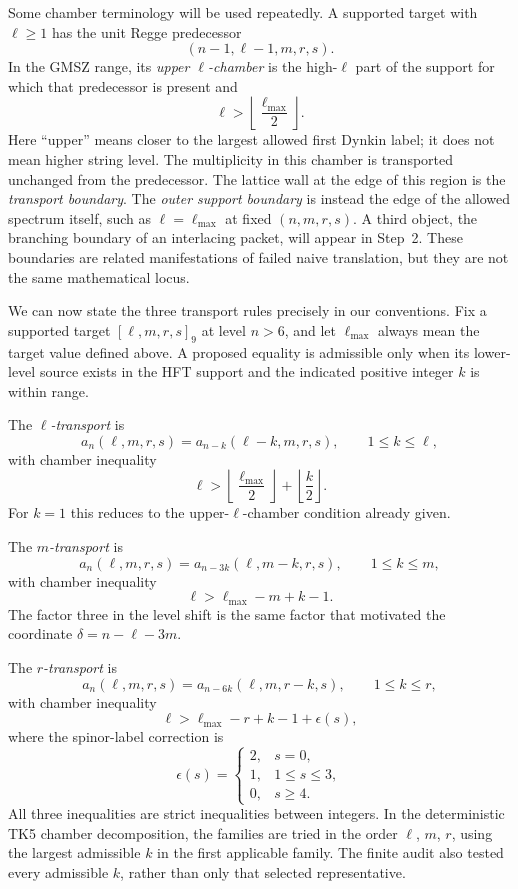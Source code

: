 \documentclass[11pt,a4paper]{article}
\theoremstyle{definition}
\begin{document}
Some chamber terminology will be used repeatedly.  A supported target with
$\ell\geq1$ has the unit Regge predecessor
\[
 (n-1,\ell-1,m,r,s).
\]
In the GMSZ range, its \emph{upper $\ell$-chamber} is the high-$\ell$ part of
the support for which that predecessor is present and
\[
 \ell>\left\lfloor\frac{\ell_{\max}}2\right\rfloor.
\]
Here ``upper'' means closer to the largest allowed first Dynkin label; it
does not mean higher string level.  The multiplicity in this chamber is
transported unchanged from the predecessor.  The lattice wall at the edge
of this region is the \emph{transport boundary}.  The \emph{outer support
boundary} is instead the edge of the allowed spectrum itself, such as
$\ell=\ell_{\max}$ at fixed $(n,m,r,s)$.  A third object, the branching
boundary of an interlacing packet, will appear in Step~2.  These boundaries
are related manifestations of failed naive translation, but they are not the
same mathematical locus.

We can now state the three transport rules precisely in our conventions.
Fix a supported target $[\ell,m,r,s]_9$ at level $n>6$, and let
$\ell_{\max}$ always mean the target value defined above.  A proposed
equality is admissible only when its lower-level source exists in the HFT
support and the indicated positive integer $k$ is within range.

The \emph{$\ell$-transport} is
\[
 a_n(\ell,m,r,s)=a_{n-k}(\ell-k,m,r,s),
 \qquad 1\leq k\leq\ell,
\]
with chamber inequality
\[
 \ell>\left\lfloor\frac{\ell_{\max}}2\right\rfloor
       +\left\lfloor\frac{k}{2}\right\rfloor.
\]
For $k=1$ this reduces to the upper-$\ell$-chamber condition already given.

The \emph{$m$-transport} is
\[
 a_n(\ell,m,r,s)=a_{n-3k}(\ell,m-k,r,s),
 \qquad 1\leq k\leq m,
\]
with chamber inequality
\[
 \ell>\ell_{\max}-m+k-1.
\]
The factor three in the level shift is the same factor that motivated the
coordinate $\delta=n-\ell-3m$.

The \emph{$r$-transport} is
\[
 a_n(\ell,m,r,s)=a_{n-6k}(\ell,m,r-k,s),
 \qquad 1\leq k\leq r,
\]
with chamber inequality
\[
 \ell>\ell_{\max}-r+k-1+\epsilon(s),
\]
where the spinor-label correction is
\[
 \epsilon(s)=
 \begin{cases}
  2, & s=0,\\
  1, & 1\leq s\leq3,\\
  0, & s\geq4.
 \end{cases}
\]
All three inequalities are strict inequalities between integers.  In the
deterministic TK5 chamber decomposition, the families are tried in the order
$\ell$, $m$, $r$, using the largest admissible $k$ in the first applicable
family.  The finite audit also tested every admissible $k$, rather than only
that selected representative.
\end{document}
